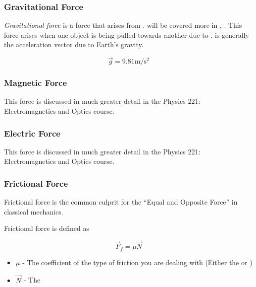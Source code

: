 \subsubsection{Gravitational Force} \label{subsubsec:Gravitational Force}
\begin{definition} \label{def:Gravitational Force}
  \emph{Gravitational force} is a force that arises from .
   will be covered more in , .
  This force arises when one object is being pulled towards another due to .
   is generally the acceleration vector due to Earth's gravity.

  \begin{equation} \label{eq:Gravitational Force}
    \vec{g} = 9.81 \si{\meter / \second^{2}}
  \end{equation}
\end{definition}

\subsubsection{Magnetic Force} \label{subsubsec:Magnetic Force}
This force is discussed in much greater detail in the Physics 221: Electromagnetics and Optics course.

\subsubsection{Electric Force} \label{subsubsec:Electric Force}
This force is discussed in much greater detail in the Physics 221: Electromagnetics and Optics course.

\subsubsection{Frictional Force} \label{subsubsec:Frictional Force}
Frictional force is the common culprit for the ``Equal and Opposite Force'' in classical mechanics.

\begin{definition} \label{def:Frictional Force}
  Frictional force is defined as
  
  \begin{equation} \label{eq:Frictional Force}
    \vec{F}_{f} = \mu \vec{N}
  \end{equation}
  \begin{itemize}[noitemsep, nolistsep]
    \item $\mu$ - The coefficient of the type of friction you are dealing with (Either the  or )
    \item $\vec{N}$ - The 
  \end{itemize}
\end{definition}

